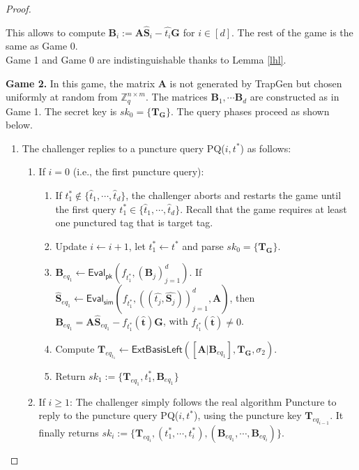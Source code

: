 \documentclass[runningheads,10pt]{llncs}
\begin{document}
\begin{proof}
\begin{description}
		This allows to compute $\textbf{B}_i:=\textbf{A}\widehat{\textbf{S}}_i-\widehat{t_i}\textbf{G}$ for $i\in [d]$.
		The rest of the game is the same as Game 0. \\
		Game 1 and Game 0 are indistinguishable thanks to Lemma \ref{lhl}.
		\item  \textbf{Game 2.} In this game,  the matrix $\textbf{A}$ is not generated by \textsf{TrapGen} 
		but chosen uniformly at random from $\mathbb{Z}_q^{n \times m}$. 
		The matrices $\textbf{B}_1, \cdots \textbf{B}_d$ are constructed as in Game 1. 
		The secret key is $sk_0=\{\textbf{T}_\textbf{G}\}$. The query phases proceed as shown below.
		\begin{enumerate}
			\item The challenger replies to a puncture query PQ($i, t^*$) as follows:
			\begin{enumerate}
				\item If $i=0$ (i.e., the first puncture query):
				\begin{enumerate}
					\item If $t^*_1 \notin\{\widehat{t}_1, \cdots, \widehat{t}_d\}$, 
					the challenger aborts and restarts the game until the first query $t^*_1 \in \{\widehat{t}_1, \cdots, \widehat{t}_d\}$. 
					Recall that the game requires at least one punctured tag that is target tag.
					\item Update $i \leftarrow i+1$, let $t^*_1\leftarrow t^*$ and parse $sk_{0}=\{\textbf{T}_{\textbf{G}}\}$.
					\item $\textbf{B}_{eq_{1}}\leftarrow \textsf{Eval}_\textsf{pk}(f_{t^*_1}, (\textbf{B}_j)_{j=1}^d)$. 
					If $\widehat{\textbf{S}}_{eq_1}\leftarrow \textsf{Eval}_\textsf{sim}(f_{t^*_1}, ((\widehat{t_j},\widehat{\textbf{S}_j}))_{j=1}^d , \textbf{A})$,
					then $\textbf{B}_{eq_{1}}=\textbf{A}\widehat{\textbf{S}}_{eq_1}-f_{t^*_1}(\widehat{\mathbf{t}})\textbf{G}$, 
					with $f_{t^*_1}(\widehat{\mathbf{t}})\neq 0$.
					\item Compute $\textbf{T}_{eq_{t_1}} \leftarrow \textsf{ExtBasisLeft}([\textbf{A}|\textbf{B}_{eq_{1}}], \textbf{T}_{\textbf{G}}, \sigma_2).$
					\item Return $sk_{1}:=\{\textbf{T}_{eq_1},t^*_1,\textbf{B}_{eq_{1}}\}$
				\end{enumerate}
				\item  If $i\geq 1$: The challenger simply follows the real algorithm \textsf{Puncture} to reply to the puncture query PQ($i, t^*$), 
				using the puncture key $\textbf{T}_{eq_{{i-1}}}$. It finally 
				returns $sk_{i}:=\{\textbf{T}_{eq_{i}},(t^*_1,\cdots, t^*_{i}), (\textbf{B}_{eq_{1}}, \cdots, \textbf{B}_{eq_{i}})\}$.

\end{enumerate}
\end{enumerate}
\end{description}
\end{proof}
\end{document}
